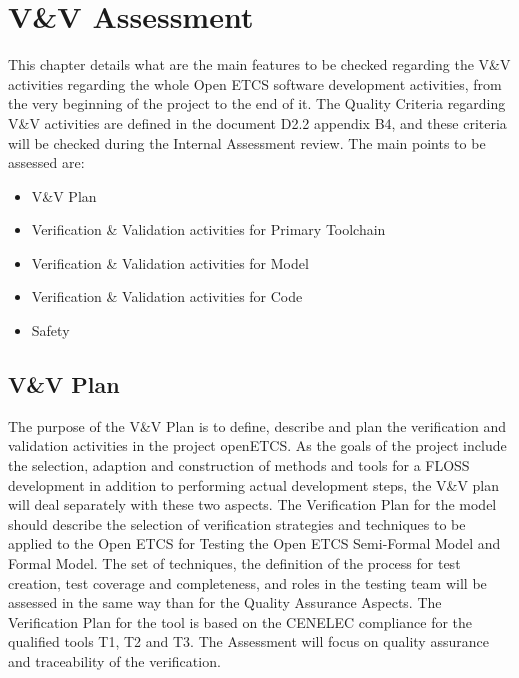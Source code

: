 \documentclass{template/openetcs_article}
\begin{document}
\section{V\&V Assessment}
This chapter details what are the main features to be checked regarding the V\&V activities regarding the whole Open ETCS software development activities, from the very beginning of the project to the end of it.
The Quality Criteria regarding V\&V activities are defined in the document D2.2 appendix B4, and these criteria will be checked during the Internal Assessment review. The main points to be assessed are:
\begin{itemize}
\item V\&V Plan
\item Verification \& Validation activities for Primary Toolchain
\item Verification \& Validation activities for Model
\item Verification \& Validation activities for Code
\item Safety
\end{itemize}

\subsection{V\&V Plan}
The purpose of the V\&V Plan is to define, describe and plan the verification and validation activities in the project openETCS. As the goals of the project include the selection, adaption and construction of methods and tools for a FLOSS development in addition to performing actual development steps, the V\&V plan will deal separately with these two aspects.
The Verification Plan for the model should describe the selection of verification strategies and techniques to be applied to the Open ETCS for Testing the Open ETCS Semi-Formal Model and Formal Model. The set of techniques, the definition of the process for test creation, test coverage and completeness, and roles in the testing team will be assessed in the same way than for the Quality Assurance Aspects.
The Verification Plan for the tool is based on the CENELEC compliance for the qualified tools T1, T2 and T3. The Assessment will focus on quality assurance and traceability of the verification.
\end{document}
